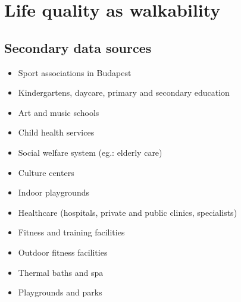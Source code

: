 \section{Life quality as walkability}

\subsection{Secondary data sources}
\label{SI:walkabilityData}
\begin{itemize}
  \item {Sport associations in Budapest}~\cite{HU_sport}
  \item {Kindergartens, daycare, primary and secondary education}~\cite{HU_Edu}
  \item {Art and music schools}~\cite{HU_Art}
  \item {Child health services}~\cite{HU_Child}
  \item {Social welfare system (eg.: elderly care)}~\cite{HU_Social}
  \item {Culture centers}~\cite{HU_Cult}
  \item {Indoor playgrounds}~\cite{HU_Play}
  \item {Healthcare (hospitals, private and public clinics, specialists)}~\cite{HU_Health}
  \item {Fitness and training facilities}~\cite{HU_Fitness}
  \item {Outdoor fitness facilities}~\cite{HU_outfitness}
  \item {Thermal baths and spa}~\cite{HU_Thermal}
  \item {Playgrounds and parks}~\cite{HU_Park}
\end{itemize}



